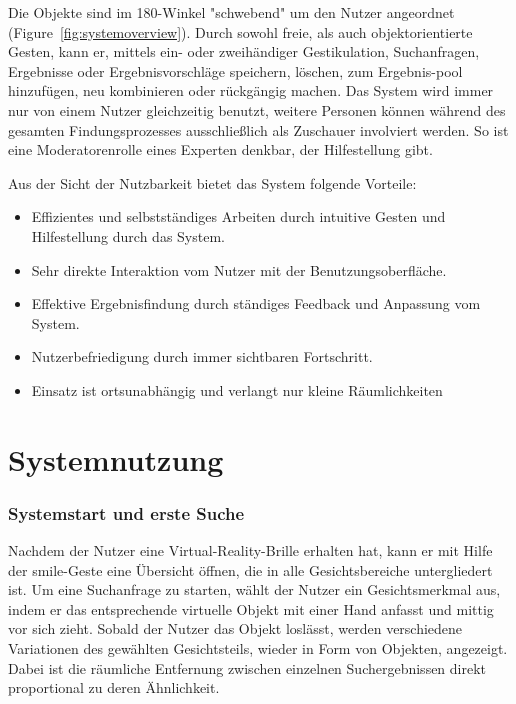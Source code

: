 \documentclass{sigchi-ext}
\begin{document}
Die Objekte sind im 180-Winkel "schwebend" um den Nutzer angeordnet (Figure~\ref{fig:systemoverview}). Durch sowohl freie, als auch objektorientierte Gesten, kann er, mittels ein- oder zweihändiger Gestikulation, Suchanfragen, Ergebnisse oder Ergebnisvorschläge speichern, löschen, zum Ergebnis-pool hinzufügen, neu kombinieren oder rückgängig machen.
Das System wird immer nur von einem Nutzer gleichzeitig benutzt,
weitere Personen können während des gesamten Findungsprozesses
ausschließlich als Zuschauer involviert werden. So ist eine
Moderatorenrolle eines Experten denkbar, der Hilfestellung gibt.

Aus der Sicht der Nutzbarkeit bietet das System folgende Vorteile:
\begin{itemize}\compresslist%
\item Effizientes und selbstständiges Arbeiten durch intuitive Gesten und Hilfestellung durch das System.
\item Sehr direkte Interaktion vom Nutzer mit der Benutzungsoberfläche.
\item Effektive Ergebnisfindung durch ständiges Feedback und Anpassung vom System.
\item Nutzerbefriedigung durch immer sichtbaren Fortschritt.
\item Einsatz ist ortsunabhängig und verlangt nur kleine Räumlichkeiten
\end{itemize}

\section{Systemnutzung}
\subsubsection{Systemstart und erste Suche}
Nachdem der Nutzer eine Virtual-Reality-Brille erhalten hat, kann er mit Hilfe der smile-Geste eine Übersicht öffnen, die in alle Gesichtsbereiche untergliedert ist. Um eine Suchanfrage zu starten, wählt der Nutzer ein Gesichtsmerkmal aus, indem er das entsprechende virtuelle Objekt mit einer Hand anfasst und mittig vor sich zieht. Sobald der Nutzer das Objekt loslässt, werden verschiedene Variationen des gewählten Gesichtsteils, wieder in Form von Objekten, angezeigt.
Dabei ist die räumliche Entfernung zwischen einzelnen Suchergebnissen direkt proportional zu deren Ähnlichkeit.
\end{document}
